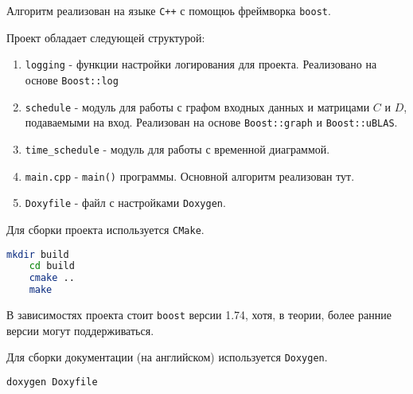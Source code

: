 Алгоритм реализован на языке \lstinline{C++} с помощюь фреймворка \lstinline{boost}.

Проект обладает следующей структурой:
\begin{enumerate}
    \item \lstinline{logging} - функции настройки логирования для проекта. Реализовано на основе \lstinline{Boost::log}
    \item \lstinline{schedule} - модуль для работы с графом входных данных и матрицами $C$ и $D$, подаваемыми на вход. Реализован на основе \lstinline{Boost::graph} и \lstinline{Boost::uBLAS}.
    \item \lstinline{time_schedule} - модуль для работы с временной диаграммой. 
    \item \lstinline{main.cpp} - \lstinline{main()} программы. Основной алгоритм реализован тут.
    \item \lstinline{Doxyfile} - файл с настройками \lstinline{Doxygen}.
\end{enumerate}

Для сборки проекта используется \lstinline{CMake}.
\begin{lstlisting}[language=bash, caption=Сборка проекта]
    mkdir build
    cd build
    cmake ..
    make
\end{lstlisting}

В зависимостях проекта стоит \lstinline{boost} версии 1.74, хотя, в теории, более ранние версии могут поддерживаться.

Для сборки документации (на английском) используется \lstinline{Doxygen}.
\begin{lstlisting}[language=bash, caption=Сборка документации]
    doxygen Doxyfile
\end{lstlisting}